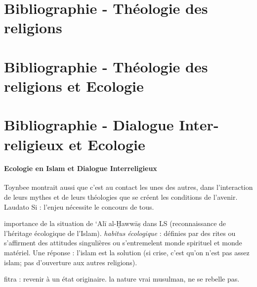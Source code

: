 \section{Bibliographie - Théologie des religions}


\section{Bibliographie - Théologie des religions et Ecologie}





  
\section{Bibliographie - Dialogue Inter-religieux et Ecologie}

\paragraph{Ecologie en Islam et Dialogue Interreligieux} \cite{pisani_ecologie_2016} 
    Toynbee montrait aussi que c’est au contact les unes des autres, dans l’interaction de leurs mythes et de leurs théologies que se créent les conditions de l’avenir.
    Laudato Si : l'enjeu nécessite le concours de tous.
   
    importance de la situation de ‘Alī al-Ḫawwāṣ dans LS (reconnaissance de l'héritage écologique de l'Islam).     
    \textit{habitus écologique} : définies par des rites ou s'affirment des attitudes singulières ou s'entremelent monde spirituel et monde matériel. 
    Une réponse : l’islam est la solution (si crise, c'est qu'on n'est pas assez islam; pas d'ouverture aux autres religions).
    
    fitra : revenir à un état originaire. la nature vrai musulman, ne se rebelle pas.
    
